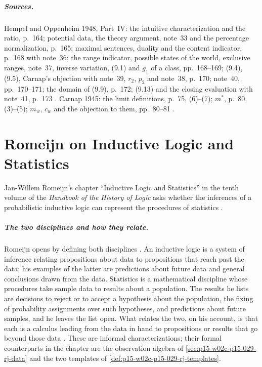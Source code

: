 \paragraph{Sources.}
Hempel and Oppenheim 1948, Part~IV: the intuitive characterization and
the ratio, p.~164; potential data, the theory argument, note~33 and the
percentage normalization, p.~165; maximal sentences, duality and the
content indicator, p.~168 with note~36; the range indicator, possible
states of the world, exclusive ranges, note~37, inverse variation, (9.1)
and \(g_1\) of a class, pp.~168--169; (9.4), (9.5), Carnap's objection
with note~39, \(r_2\), \(p_2\) and note~38, p.~170; note~40,
pp.~170--171; the domain of (9.9), p.~172; (9.13) and the closing
evaluation with note~41, p.~173
\cite[pp.~164--173]{HempelOppenheim1948Explanation}. Carnap 1945: the
limit definitions, p.~75, (6)--(7); \(m^\ast\), p.~80, (3)--(5); \(m_w\),
\(c_w\) and the objection to them, pp.~80--81
\cite{Carnap1945InductiveLogic}.

\chapter{Romeijn on Inductive Logic and Statistics}
\label{sec:p15-w02c-p15-029-romeijn}

Jan-Willem Romeijn's chapter ``Inductive Logic and Statistics'' in the
tenth volume of the \emph{Handbook of the History of Logic} asks whether
the inferences of a probabilistic inductive logic can represent the
procedures of statistics \cite[pp.~625--650]{Romeijn2011InductiveLogicStatistics}.

\paragraph{The two disciplines and how they relate.}
Romeijn opens by defining both disciplines
\cite[p.~625]{Romeijn2011InductiveLogicStatistics}. An inductive logic
is a system of inference relating propositions about data to
propositions that reach past the data; his examples of the latter are
predictions about future data and general conclusions drawn from the
data. Statistics is a mathematical discipline whose procedures take
sample data to results about a population. The results he lists are
decisions to reject or to accept a hypothesis about the population,
the fixing of probability assignments over such hypotheses, and
predictions about future samples, and he leaves the list open. What
relates the two, on his account, is that each is a calculus leading
from the data in hand to propositions or results that go beyond those
data \cite[p.~625]{Romeijn2011InductiveLogicStatistics}. These are
informal characterizations; their formal counterparts in the chapter
are the observation algebra of \cref{sec:p15-w02c-p15-029-rj-data} and
the two templates of \cref{def:p15-w02c-p15-029-rj-templates}.

